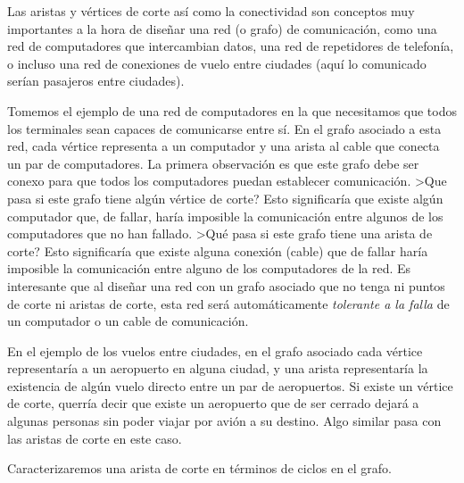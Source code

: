\begin{ejemplo}
Las aristas y vértices de corte así como la conectividad son conceptos muy importantes a la hora de diseñar una red (o grafo) de comunicación, como una red de computadores que intercambian datos, una red de repetidores de telefonía, o incluso una red de conexiones de vuelo entre ciudades (aquí lo comunicado serían pasajeros entre ciudades).

Tomemos el ejemplo de una red de computadores en la que necesitamos que todos los terminales sean capaces de comunicarse entre sí.
En el grafo asociado a esta red, cada vértice representa a un computador y una arista al cable que conecta un par de computadores.
La primera observación es que este grafo debe ser conexo para que todos los computadores puedan establecer comunicación.
>Que pasa si este grafo tiene algún vértice de corte?
Esto significaría que existe algún computador que, de fallar, haría imposible la comunicación entre algunos de los computadores que no han fallado.
>Qué pasa si este grafo tiene una arista de corte?
Esto significaría que existe alguna conexión (cable) que de fallar haría imposible la comunicación entre alguno de los computadores de la red.
Es interesante que al diseñar una red con un grafo asociado que no tenga ni puntos de corte ni aristas de corte, esta red será automáticamente \emph{tolerante a la falla} de un computador o un cable de comunicación.

En el ejemplo de los vuelos entre ciudades, en el grafo asociado cada vértice representaría a un aeropuerto en alguna ciudad, y una arista representaría la existencia de algún vuelo directo entre un par de aeropuertos.
Si existe un vértice de corte, querría decir que existe un aeropuerto que de ser cerrado dejará a algunas personas sin poder viajar por avión a su destino.
Algo similar pasa con las aristas de corte en este caso.
\end{ejemplo}

Caracterizaremos una arista de corte en términos de ciclos en el grafo.

